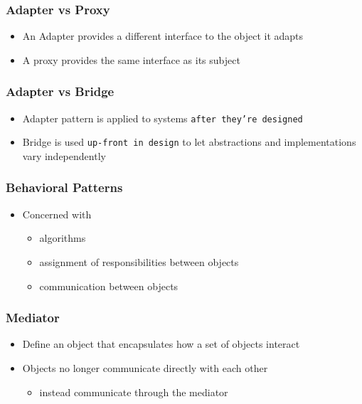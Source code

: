 \documentclass{beamer}
\begin{document}
\begin{frame}[fragile]
\frametitle{Adapter vs Proxy}

\begin{itemize}
\item An Adapter provides a different interface to the object it adapts
\item A proxy provides the same interface as its subject
\end{itemize}

\end{frame}


\begin{frame}[fragile]
\frametitle{Adapter vs Bridge}
\begin{itemize}
\item Adapter pattern is applied to systems \texttt{after they're designed}
\item Bridge is used \texttt{up-front in design} to let abstractions and implementations vary independently
\end{itemize}
\end{frame}



\begin{frame}[fragile]
\frametitle{Behavioral Patterns}

\begin{itemize}
\item Concerned with 
    \begin{itemize}
    \item algorithms 
    \item assignment of responsibilities between objects
    \item communication between objects 
    \end{itemize}
\end{itemize}

\end{frame}




\begin{frame}[fragile]
\frametitle{Mediator}
\begin{itemize}
\item Define an object that encapsulates how a set of objects interact
\item Objects no longer communicate directly with each other 
    \begin{itemize}
        \item instead communicate through the mediator
    \end{itemize}     
\end{itemize}
\end{frame}
\end{document}
